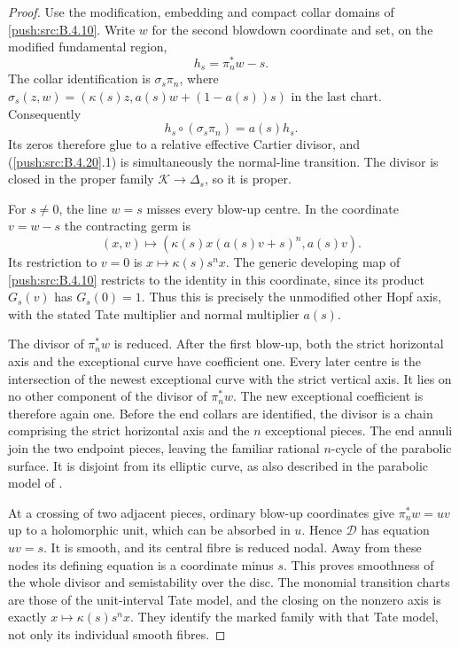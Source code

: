 \begin{proof}
Use the modification, embedding and compact collar
domains of \ref{push:src:B.4.10}. Write $w$ for the second blowdown
coordinate and set, on the modified fundamental region,
\[
 h_s=\pi_n^*w-s.
\]
The collar identification is $\sigma_s\pi_n$, where
$\sigma_s(z,w)=(\kappa(s)z,a(s)w+(1-a(s))s)$ in
the last chart. Consequently
\[
 h_s\circ(\sigma_s\pi_n)=a(s)h_s.
 \tag{B.4.20.1}
\]
Its zeros therefore glue to a relative effective
Cartier divisor, and (\ref{push:src:B.4.20}.1) is simultaneously the
normal-line transition. The divisor is closed in the
proper family $\mathcal K\to\Delta_s$, so it is proper.

For $s\ne0$, the line $w=s$ misses every blow-up centre.
In the coordinate $v=w-s$ the contracting germ is
\[
 (x,v)\longmapsto
       (\kappa(s)x(a(s)v+s)^n,a(s)v).
\]
Its restriction to $v=0$ is
$x\mapsto\kappa(s)s^n x$. The generic developing
map of \ref{push:src:B.4.10} restricts to the identity in this
coordinate, since its product $G_s(v)$ has
$G_s(0)=1$. Thus this is precisely the unmodified
other Hopf axis, with the stated Tate multiplier
and normal multiplier $a(s)$.

The divisor of $\pi_n^*w$ is reduced. After the first
blow-up, both the strict horizontal axis and the
exceptional curve have coefficient one. Every later
centre is the intersection of the newest exceptional
curve with the strict vertical axis. It lies on no
other component of the divisor of $\pi_n^*w$.
The new exceptional coefficient is therefore again
one. Before the end collars are identified, the
divisor is a chain comprising the strict horizontal
axis and the $n$ exceptional pieces. The end annuli
join the two endpoint pieces, leaving the familiar
rational $n$-cycle of the parabolic surface.
It is disjoint from its elliptic curve, as also
described in the parabolic model of
\cite[Example 9.10]{IstratiEtAl2022Root}.

At a crossing of two adjacent pieces, ordinary
blow-up coordinates give $\pi_n^*w=uv$ up to a
holomorphic unit, which can be absorbed in $u$.
Hence $\mathcal D$ has equation $uv=s$. It is
smooth, and its central fibre is reduced nodal.
Away from these nodes its defining equation is
a coordinate minus $s$. This proves smoothness
of the whole divisor and semistability over the disc.
The monomial transition charts are those of the
unit-interval Tate model, and the closing on the
nonzero axis is exactly $x\mapsto\kappa(s)s^n x$.
They identify the marked family with that Tate
model, not only its individual smooth fibres.


\end{proof}
